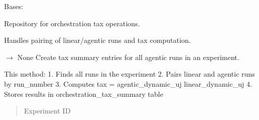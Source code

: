 \documentclass[letterpaper,10pt,english]{sphinxmanual}
\begin{document}
\begin{fulllineitems}
\label{\detokenize{core.database.repositories.tax:core.database.repositories.tax.TaxRepository}}
\pysigstartsignatures
\pysiglinewithargsret
{}
{}
{}
\pysigstopsignatures
\sphinxAtStartPar
Bases: 

\sphinxAtStartPar
Repository for orchestration tax operations.

\sphinxAtStartPar
Handles pairing of linear/agentic runs and tax computation.

\begin{fulllineitems}
\label{\detokenize{core.database.repositories.tax:core.database.repositories.tax.TaxRepository.create_tax_summaries}}
\pysigstartsignatures
\pysiglinewithargsret
{}
{}
{{ $\rightarrow$ None}}
\pysigstopsignatures
\sphinxAtStartPar
Create tax summary entries for all agentic runs in an experiment.

\sphinxAtStartPar
This method:
1. Finds all runs in the experiment
2. Pairs linear and agentic runs by run\_number
3. Computes tax = agentic\_dynamic\_uj \sphinxhyphen{} linear\_dynamic\_uj
4. Stores results in orchestration\_tax\_summary table
\begin{quote}\begin{description}
\sphinxAtStartPar
{} \textendash{} Experiment ID

\end{description}\end{quote}

\end{fulllineitems}



\end{fulllineitems}
\end{document}
